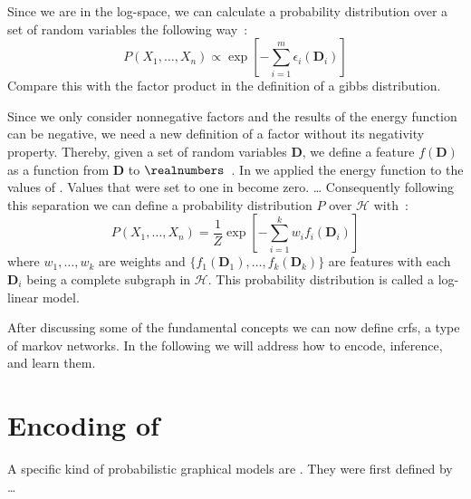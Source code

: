 Since we are in the log-space, we can calculate a \gls{probability distribution} over a set of \glspl{random variable} the following way~\citep{koller2009probabilistic}:
\begin{equation*}
  P(X_1,\dots,X_n) \propto \exp\left [-\sum_{i=1}^m\epsilon_i(\bm{D}_i)\right ]
\end{equation*}
Compare this with the \gls{factor product} in the definition of a \gls{gibbs distribution}.

Since we only consider nonnegative \glspl{factor} and the results of the \gls{energy function} can be negative, we need a new definition of a \gls{factor} without its negativity property.
Thereby, given a set of \glspl{random variable} $\bm{D}$, we define a \gls{feature} $f(\bm{D})$ as a function from $\bm{D}$ to $\realnumbers$~\citep{koller2009probabilistic}.
In  we applied the \gls{energy function} to the values of .
Values that were set to one in  become zero. \dots{}
Consequently following this separation we can define a \gls{probability distribution} $P$ over $\mathcal{H}$ with~\citep{koller2009probabilistic}:
\begin{equation*}
  P(X_1,\dots,X_n) = \frac{1}{Z}\exp\left [-\sum_{i=1}^k w_i f_i(\bm{D}_i)\right ]
\end{equation*}
where $w_1,\dots,w_k$ are weights and $\{f_1(\bm{D}_1),\dots,f_k(\bm{D}_k)\}$ are features with each $\bm{D}_i$ being a complete subgraph in $\mathcal{H}$.
This \gls{probability distribution} is called a \gls{log-linear model}.

\bigskip

After discussing some of the fundamental concepts we can now define \glspl{crf}, a type of \glspl{markov network}. In the following we will address how to encode, inference, and learn them.

\section{Encoding of }\label{sec:definition-crfs}
A specific kind of \glspl{probabilistic graphical model} are .
They were first defined by \citet{lafferty2001conditional} \dots

\bigskip


